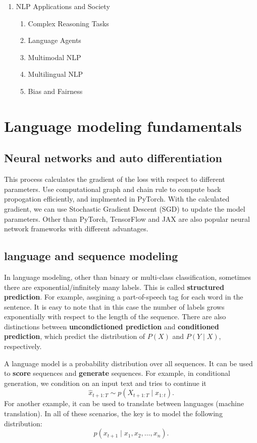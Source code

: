 \documentclass[a4paper]{article}
\begin{document}
\begin{enumerate}
  \item NLP Applications and Society
  \begin{enumerate}
    \item Complex Reasoning Tasks
    \item Language Agents
    \item Multimodal NLP
    \item Multilingual NLP
    \item Bias and Fairness
  \end{enumerate}
\end{enumerate}

\section{Language modeling fundamentals}

\subsection{Neural networks and auto differentiation}
This process calculates the gradient of the loss with 
respect to different parameters. Use computational graph 
and chain rule to compute back propogation efficiently, 
and implmented in PyTorch. With the calculated gradient, 
we can use Stochastic Gradient Descent (SGD) to update 
the model parameters. 
Other than PyTorch, TensorFlow and JAX are also popular 
neural network frameworks with different advantages.

\subsection{language and sequence modeling} 

In language modeling, other than binary or multi-class 
classification, sometimes there are exponential/infinitely
many labels. This is called \textbf{structured prediction}. 
For example, assgining a part-of-speech tag for each word in the 
sentence. It is easy to note that in this case the number 
of labels grows exponentially with respect to the length 
of the sequence.
There are also distinctions between \textbf{uncondictioned 
prediction} and \textbf{conditioned prediction}, which predict 
the distribution of $P(X)$ and $P(Y \mid X)$, respectively.

A language model is a probability distribution over all 
sequences. It can be used to \textbf{score} sequences
and \textbf{generate} sequences. For example, in 
conditional generation, we condition on an input text and 
tries to continue it 
\[
\hat{x}_{t + 1: T} \sim p(X_{t+1: T} \mid x_{1 : t}).
\]
For another example, it can be used to translate between 
languages (machine translation). In all of these scenarios, 
the key is to model the following distribution:
\[
p(x_{t + 1} \mid x_1, x_2, \dots, x_n).
\]
\end{document}
